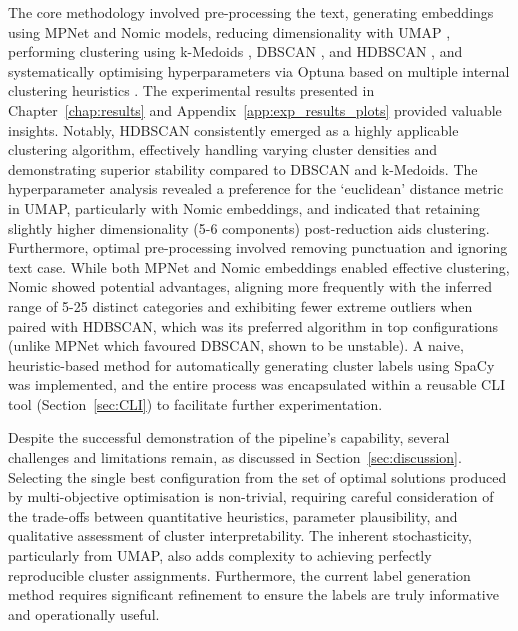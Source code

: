 \documentclass[10pt,oneside]{report}
\begin{document}
The core methodology involved pre-processing the text, generating embeddings using MPNet \cite{song2020mpnet} and Nomic \cite{nussbaum2024nomic} models, reducing dimensionality with UMAP \cite{mcinnes2018umap}, performing clustering using k-Medoids \cite{kmedoids}, DBSCAN \cite{ester1996density}, and HDBSCAN \cite{campello2013density}, and systematically optimising hyperparameters via Optuna \cite{akiba2019optuna} based on multiple internal clustering heuristics \cite{rousseeuw1987silhouettes, davies1979cluster, calinski1974dendrite}. The experimental results presented in Chapter~\ref{chap:results} and Appendix~\ref{app:exp_results_plots} provided valuable insights. Notably, HDBSCAN \cite{campello2013density} consistently emerged as a highly applicable clustering algorithm, effectively handling varying cluster densities and demonstrating superior stability compared to DBSCAN and k-Medoids. The hyperparameter analysis revealed a preference for the `euclidean' distance metric in UMAP, particularly with Nomic embeddings, and indicated that retaining slightly higher dimensionality (5-6 components) post-reduction aids clustering. Furthermore, optimal pre-processing involved removing punctuation and ignoring text case. While both MPNet and Nomic embeddings enabled effective clustering, Nomic showed potential advantages, aligning more frequently with the inferred range of 5-25 distinct categories and exhibiting fewer extreme outliers when paired with HDBSCAN, which was its preferred algorithm in top configurations (unlike MPNet which favoured DBSCAN, shown to be unstable). A naive, heuristic-based method for automatically generating cluster labels using SpaCy \cite{spacy2} was implemented, and the entire process was encapsulated within a reusable CLI tool (Section~\ref{sec:CLI}) to facilitate further experimentation.

Despite the successful demonstration of the pipeline's capability, several challenges and limitations remain, as discussed in Section~\ref{sec:discussion}. Selecting the single best configuration from the set of optimal solutions produced by multi-objective optimisation is non-trivial, requiring careful consideration of the trade-offs between quantitative heuristics, parameter plausibility, and qualitative assessment of cluster interpretability. The inherent stochasticity, particularly from UMAP, also adds complexity to achieving perfectly reproducible cluster assignments. Furthermore, the current label generation method requires significant refinement to ensure the labels are truly informative and operationally useful.
\end{document}
